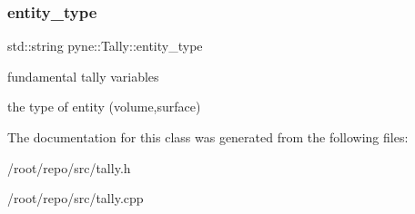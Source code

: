 \subsubsection{\texorpdfstring{entity\+\_\+type}{entity\_type}}
{\footnotesize\ttfamily std\+::string pyne\+::\+Tally\+::entity\+\_\+type}



fundamental tally variables 

the type of entity (volume,surface) 

The documentation for this class was generated from the following files\+:\begin{DoxyCompactItemize}
\item 
/root/repo/src/tally.\+h\item 
/root/repo/src/tally.\+cpp\end{DoxyCompactItemize}
